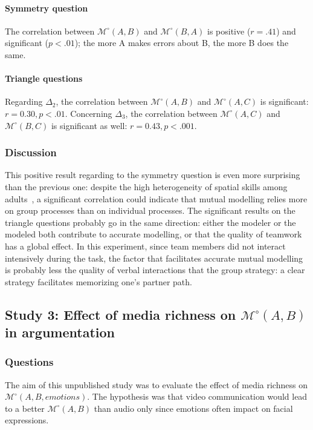 \documentclass[twocolumn]{article}
\newcommand{\Model}[3]{{$\mathcal{M}^{\circ}(#1, #2, #3)$}}
\newcommand{\gModel}[2]{{$\mathcal{M}^{\circ}(#1, #2)$}}
\begin{document}
\paragraph{Symmetry question} The correlation between \gModel{A}{B}  and
\gModel{B}{A}  is positive ($r = .41$) and significant ($p < .01$);  the more A
makes errors about B, the more B does the same.

\paragraph{Triangle questions} Regarding $\Delta_2$, the correlation between
\gModel{A}{B} and \gModel{A}{C} is significant: $r=0.30, p <.01$. Concerning
$\Delta_3$, the correlation between \gModel{A}{C} and \gModel{B}{C} is
significant as well: $r=0.43, p <.001$.

\subsubsection*{Discussion}

This positive result regarding to the symmetry question is even more surprising
than the previous one: despite the high heterogeneity of spatial skills among
adults~\citep{liben1981spatial}, a significant correlation could indicate that
mutual modelling relies more on group processes than on individual processes. The
significant results on the triangle questions probably go in the same direction:
either the modeler or the modeled both contribute to accurate modelling, or that
the quality of teamwork has a global effect. In this experiment, since team
members did not interact intensively during the task, the factor that
facilitates accurate mutual modelling is probably less the quality of verbal
interactions that the group strategy: a clear strategy facilitates memorizing
one's partner path. 




\subsection{Study 3:  Effect of media richness on \gModel{A}{B} in argumentation}

\subsubsection*{Questions}

The aim of this unpublished study was to evaluate the effect of media richness
on \Model{A}{B}{emotions}. The hypothesis was that video communication would
lead to a better \gModel{A}{B} than audio only since emotions often impact on
facial expressions.
\end{document}
